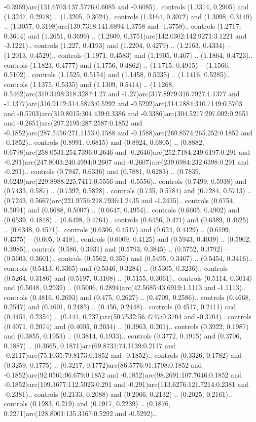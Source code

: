 -0.3969)arc(131.6703:137.5776:0.6085 and -0.6085).. controls (1.3314, 0.2905) and (1.3247, 0.2978) .. (1.3205, 0.3024).. controls (1.3164, 0.3072) and (1.3098, 0.3149) .. (1.3057, 0.3198)arc(139.7318:141.6894:1.3758 and -1.3758).. controls (1.2717, 0.3614) and (1.2651, 0.3699) .. (1.2609, 0.3751)arc(142.0302:142.9271:3.1221 and -3.1221).. controls (1.227, 0.4193) and (1.2204, 0.4279) .. (1.2163, 0.4334) -- (1.2013, 0.4529).. controls (1.1971, 0.4583) and (1.1905, 0.467) .. (1.1864, 0.4723).. controls (1.1823, 0.4777) and (1.1756, 0.4862) .. (1.1715, 0.4915) -- (1.1566, 0.5102).. controls (1.1525, 0.5154) and (1.1458, 0.5235) .. (1.1416, 0.5285).. controls (1.1375, 0.5335) and (1.1309, 0.5414) .. (1.1268, 0.5462)arc(319.3498:318.3287:1.27 and -1.27)arc(317.8979:316.7927:1.1377 and -1.1377)arc(316.9112:314.5873:0.5292 and -0.5292)arc(314.7884:310.7149:0.5703 and -0.5703)arc(310.8015:304.439:0.3386 and -0.3386)arc(304.5217:297.002:0.2651 and -0.2651)arc(297.2195:287.2587:0.1852 and -0.1852)arc(287.5456:271.1153:0.1588 and -0.1588)arc(269.8574:265.252:0.1852 and -0.1852).. controls (0.8991, 0.6815) and (0.8924, 0.6805) .. (0.8882, 0.6798)arc(258.0531:254.7396:0.2646 and -0.2646)arc(252.7184:249.6197:0.291 and -0.291)arc(247.8003:240.4994:0.2607 and -0.2607)arc(239.6984:232.6398:0.291 and -0.291).. controls (0.7947, 0.6336) and (0.7881, 0.6283) .. (0.7839, 0.6249)arc(229.8988:225.7411:0.5556 and -0.5556).. controls (0.7499, 0.5938) and (0.7433, 0.587) .. (0.7392, 0.5828).. controls (0.735, 0.5784) and (0.7284, 0.5713) .. (0.7243, 0.5667)arc(221.9756:218.7936:1.2435 and -1.2435).. controls (0.6754, 0.5091) and (0.6688, 0.5007) .. (0.6647, 0.4954).. controls (0.6605, 0.4902) and (0.6539, 0.4818) .. (0.6498, 0.4764).. controls (0.6456, 0.471) and (0.6389, 0.4625) .. (0.6348, 0.4571).. controls (0.6306, 0.4517) and (0.624, 0.4429) .. (0.6199, 0.4375) -- (0.605, 0.418).. controls (0.6009, 0.4125) and (0.5943, 0.4039) .. (0.5902, 0.3985).. controls (0.586, 0.3931) and (0.5793, 0.3845) .. (0.5752, 0.3792) -- (0.5603, 0.3601).. controls (0.5562, 0.355) and (0.5495, 0.3467) .. (0.5454, 0.3416).. controls (0.5413, 0.3365) and (0.5346, 0.3284) .. (0.5305, 0.3236).. controls (0.5264, 0.3186) and (0.5197, 0.3108) .. (0.5155, 0.3061).. controls (0.5114, 0.3014) and (0.5048, 0.2939) .. (0.5006, 0.2894)arc(42.5685:43.6919:1.1113 and -1.1113).. controls (0.4816, 0.2693) and (0.475, 0.2627) .. (0.4709, 0.2586).. controls (0.4668, 0.2547) and (0.4601, 0.2485) .. (0.456, 0.2448).. controls (0.4517, 0.2411) and (0.4451, 0.2354) .. (0.441, 0.232)arc(50.7532:56.4747:0.3704 and -0.3704).. controls (0.4071, 0.2074) and (0.4005, 0.2034) .. (0.3963, 0.201).. controls (0.3922, 0.1987) and (0.3855, 0.1953) .. (0.3814, 0.1933).. controls (0.3772, 0.1915) and (0.3706, 0.1887) .. (0.3665, 0.1871)arc(69.8731:74.1139:0.2117 and -0.2117)arc(75.1035:79.8173:0.1852 and -0.1852).. controls (0.3326, 0.1782) and (0.3259, 0.1775) .. (0.3217, 0.1772)arc(86.5776:91.1798:0.1852 and -0.1852)arc(92.0561:96.679:0.1852 and -0.1852)arc(98.2691:107.7646:0.1852 and -0.1852)arc(109.3677:112.5023:0.291 and -0.291)arc(113.6276:121.7214:0.2381 and -0.2381).. controls (0.2133, 0.2088) and (0.2066, 0.2132) .. (0.2025, 0.2161).. controls (0.1983, 0.219) and (0.1917, 0.2239) .. (0.1876, 0.2271)arc(128.8001:135.3167:0.5292 and -0.5292).. 